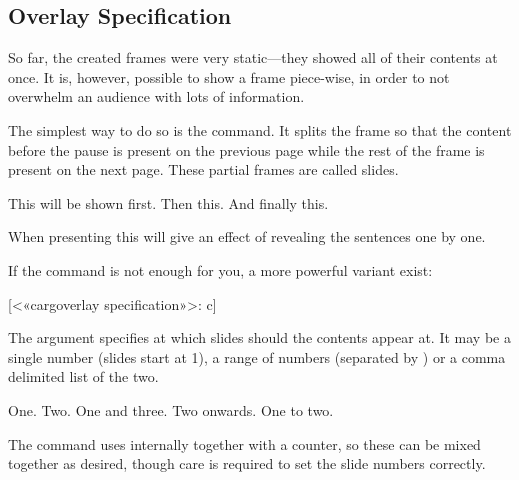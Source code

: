 \subsection{Overlay Specification}

So far, the created frames were very static---they showed all of their contents
at once. It is, however, possible to show a frame piece-wise, in order to not
overwhelm an audience with lots of information.

The simplest way to do so is the  command. It splits the frame so
that the content before the pause is present on the previous page while the
rest of the frame is present on the next page. These partial frames are called
slides.
\begin{example}[
  vertical_mode,
  to_page=3,
  paperheight=2.8cm,
  paperwidth=3.7cm,
  examplewidth=.95\linewidth,
]
\begin{frame}
  This will be shown first. \pause Then this. \pause
  And finally this.
\end{frame}
\end{example}
When presenting this will give an effect of revealing the sentences one by one.

If the  command is not enough for you, a more powerful variant
exist:
\begin{lscommand}
  [<«\bs carg{overlay specification}»>: c]
\end{lscommand}
The  argument specifies at which slides should the
contents appear at. It may be a single number (slides start at 1), a range of
numbers (separated by \cargv{-}) or a comma delimited list of the two.
\begin{chktexignore}
\begin{example}[
  vertical_mode,
  to_page=3,
  paperheight=2.8cm,
  paperwidth=3.7cm,
  examplewidth=.95\linewidth,
]
\begin{frame}
   One.  Two.  One and
  three.  Two onwards.  One to two.
\end{frame}
\end{example}
\end{chktexignore}
The  command uses  internally together with a counter,
so these can be mixed together as desired, though care is required to set the
slide numbers correctly.

